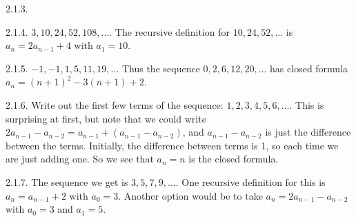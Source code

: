 \begin {itemize}
\begin{ans}{2.1.3.}
\end{ans}
\begin{ans}{2.1.4.}
		$3, 10, 24, 52, 108,\ldots$.  The recursive definition for $10, 24, 52, \ldots$ is $a_n = 2a_{n-1} + 4$ with $a_1 = 10$.
	
\end{ans}
\begin{ans}{2.1.5.}
		$-1, -1, 1, 5, 11, 19,\ldots$  Thus the sequence $0, 2, 6, 12, 20,\ldots$ has closed formula $a_n = (n+1)^2 - 3(n+1) + 2$.
	
\end{ans}
\begin{ans}{2.1.6.}
		Write out the first few terms of the sequence: $1, 2, 3, 4, 5, 6,\ldots$.  This is surprising at first, but note that we could write $2a_{n-1} - a_{n-2} = a_{n-1} + (a_{n-1} -a_{n-2})$, and $a_{n-1} - a_{n-2}$ is just the difference between the terms.  Initially, the difference between terms is 1, so each time we are just adding one.  So we see that $a_n = n$ is the closed formula.
	
\end{ans}
\begin{ans}{2.1.7.}
		The sequence we get is $3, 5, 7, 9, \ldots$.  One recursive definition for this is $a_n = a_{n-1} + 2$ with $a_0 = 3$.  Another option would be to take $a_n = 2a_{n-1} - a_{n-2}$ with $a_0 = 3$ and $a_1 = 5$.
	
\end{ans}
\protect \end {itemize}
